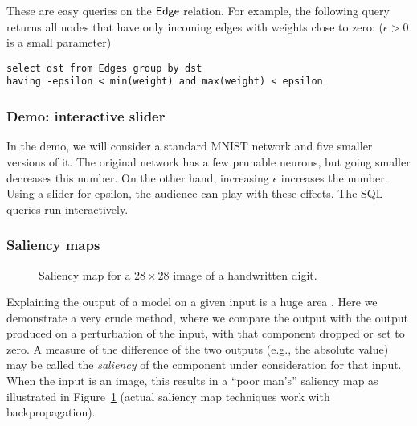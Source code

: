 \documentclass{article}
\begin{document}
These are easy queries on
the $\sf Edge$ relation.  For example, the following query
returns all nodes that have only incoming edges with weights
close to zero:
($\epsilon>0$ is a small parameter)
\begin{verbatim}
select dst from Edges group by dst
having -epsilon < min(weight) and max(weight) < epsilon
\end{verbatim}

\subsubsection*{Demo: interactive slider}
In the demo, we will consider a standard MNIST network 
and five smaller versions of it.  The original network has a few
prunable neurons, but going smaller decreases this number.  On
the other hand, increasing $\epsilon$ increases the number.
Using a slider for epsilon, the audience can play with these
effects.  The SQL queries run interactively.

\subsubsection*{Saliency maps}

\begin{figure}
  \centering
  \caption{Saliency map for a $28\times 28$ image of a handwritten digit.}
  \label{salfig}
  \end{figure}

Explaining the output of a model on a given input is a huge area
\cite{molnar-book,foscadino-explain-survey}.  
Here we demonstrate a very crude method, where we
compare the output with the output produced on a perturbation of the
input, with that component dropped or set to zero.  A measure of
the difference of the two outputs (e.g., the absolute value) may
be called the \emph{saliency} of the component under consideration
for that input.  When the input is an image, this results in a
``poor man's'' saliency map as illustrated in
Figure~\ref{salfig} (actual saliency map techniques
work with backpropagation).
\end{document}
